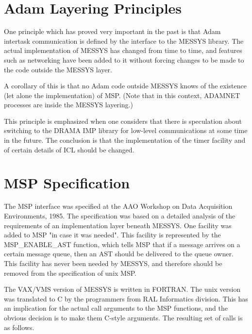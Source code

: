 \section {Adam Layering Principles}

One principle which has proved very important in the past is that Adam
intertask communication is defined by the interface to the MESSYS
library. The actual implementation of MESSYS has changed from time to
time, and features such as networking have been added to it without
forcing changes to be made to the code outside the MESSYS layer.

A corollary of this is that no Adam code outside MESSYS knows of the
existence (let alone the implementation) of MSP. (Note that in this
context, ADAMNET processes are inside the MESSYS layering.)

This principle is emphasized when one considers that there is
speculation about switching to the DRAMA IMP library for low-level
communications at some time in the future. The conclusion is that the
implementation of the timer facility and of certain details of ICL
should be changed.


\section {MSP Specification}

The MSP interface was specified at the AAO Workshop on Data Acquisition
Environments, 1985. The specification was based on a detailed analysis
of the requirements of an implementation layer beneath MESSYS. One
facility was added to MSP "in case it was needed". This facility is
represented by the MSP\_ENABLE\_AST function, which tells MSP that if a
message arrives on a certain message queue, then an AST should be
delivered to the queue owner. This facility has never been needed by
MESSYS, and therefore should be removed from the specification of unix
MSP.

The VAX/VMS version of MESSYS is written in FORTRAN. The unix version
was translated to C by the programmers from RAL Informatics division.
This has an implication for the actual call arguments to the MSP
functions, and the obvious decision is to make them C-style arguments.
The resulting set of calls is as follows.

